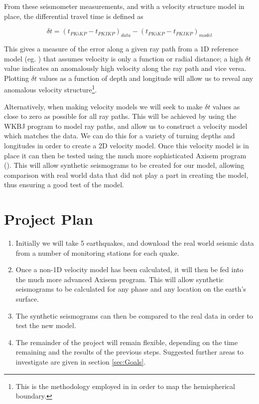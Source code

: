 \documentclass[11pt,a4paper]{article}
\begin{document}
From these seismometer measurements, and with a velocity structure model in place, the differential travel time is defined as

\begin{equation}
	\delta t = (t_{PKiKP} - t_{PKIKP})_{data} - (t_{PKiKP} - t_{PKIKP})_{model}
\end{equation}

This gives a measure of the error along a given ray path from a 1D reference model (eg. \cite{Kennett1995}) that assumes velocity is only a function or radial distance; a high $\delta t$ value indicates an anomalously high velocity along the ray path and vice versa. Plotting $\delta t$ values as a function of depth and longitude will allow us to reveal any anomalous velocity structure\footnote{This is the methodology employed in \cite{Waszek2011a} in order to map the hemispherical boundary.}.

Alternatively, when making velocity models we will seek to make $\delta t$ values as close to zero as possible for all ray paths. This will be achieved by using the WKBJ program to model ray paths, and allow us to construct a velocity model which matches the data. We can do this for a variety of turning depths and longitudes in order to create a 2D velocity model. Once this velocity model is in place it can then be tested using the much more sophisticated Axisem program (\cite{Nissen-Meyer2014}). This will allow synthetic seismograms to be created for our model, allowing comparison with real world data that did not play a part in creating the model, thus ensuring a good test of the model.

\section{Project Plan}

\begin{enumerate}
	\item Initially we will take 5 earthquakes, and download the real world seismic data from a number of monitoring stations for each quake. 
	\item Once a non-1D velocity model has been calculated, it will then be fed into the much more advanced Axisem program. This will allow synthetic seismograms to be calculated for any phase and any location on the earth's surface.
	\item The synthetic seismograms can then be compared to the real data in order to test the new model.
	\item The remainder of the project will remain flexible, depending on the time remaining and the results of the previous steps. Suggested further areas to investigate are given in section \ref{sec:Goals}.
\end{enumerate}



\end{document}
